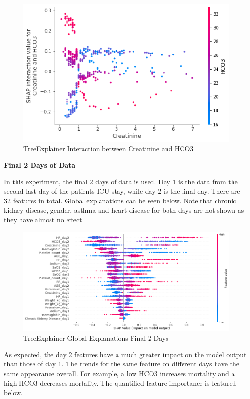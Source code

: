 \documentclass[12pt]{article}
\begin{document}
\begin{figure}[H]
\centering\caption{TreeExplainer Interaction between Creatinine and HCO3}
\includegraphics[scale=0.7]{TreeExplainer Final1 Global/TreeExplainer Final1 Interaction Creatinine HCO3.png}
\end{figure}

\textbf{Final 2 Days of Data}

In this experiment, the final 2 days of data is used. Day 1 is the data from the second last day of the patients ICU stay, while day 2 is the final day. There are 32 features in total. Global explanations can be seen below. Note that chronic kidney disease, gender, asthma and heart disease for both days are not shown as they have almost no effect.

\begin{figure}[H]
\centering\caption{TreeExplainer Global Explanations Final 2 Days}
\includegraphics[scale=0.47]{TreeExplainer Final2/TreeExplainer Final2 Global.png}
\end{figure}

As expected, the day 2 features have a much greater impact on the model output than those of day 1. The trends for the same feature on different days have the same appearance overall. For example, a low HCO3 increases mortality and a high HCO3 decreases mortality. The quantified feature importance is featured below.
\end{document}
